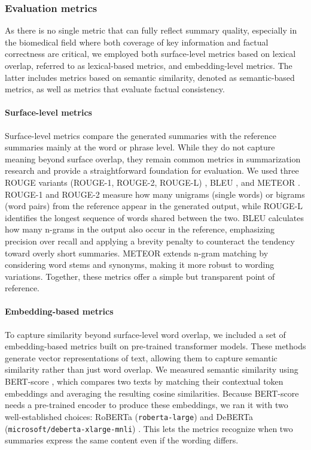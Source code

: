 \subsubsection{Evaluation metrics}

As there is no single metric that can fully reflect summary quality, especially in the biomedical field where both coverage of key information and factual correctness are critical, we employed both surface-level metrics based on lexical overlap, referred to as lexical-based metrics, and embedding-level metrics. The latter includes metrics based on semantic similarity, denoted as semantic-based metrics, as well as metrics that evaluate factual consistency.

\paragraph{Surface-level metrics}

Surface-level metrics compare the generated summaries with the reference summaries mainly at the word or phrase level. While they do not capture meaning beyond surface overlap, they remain common metrics in summarization research and provide a straightforward foundation for evaluation. We used three \ac{ROUGE} variants (ROUGE-1, ROUGE-2, ROUGE-L) \cite{lin-2004-rouge}, \ac{BLEU} \cite{papineni-etal-2002-bleu}, and \ac{METEOR} \cite{banerjee-lavie-2005-meteor}. ROUGE-1 and ROUGE-2 measure how many unigrams (single words) or bigrams (word pairs) from the reference appear in the generated output, while ROUGE-L identifies the longest sequence of words shared between the two. \ac{BLEU} calculates how many n-grams in the output also occur in the reference, emphasizing precision over recall and applying a brevity penalty to counteract the tendency toward overly short summaries. \ac{METEOR} extends n-gram matching by considering word stems and synonyms, making it more robust to wording variations. Together, these metrics offer a simple but transparent point of reference.

\paragraph{Embedding-based metrics}

To capture similarity beyond surface-level word overlap, we included a set of embedding-based metrics built on pre-trained transformer models. These methods generate vector representations of text, allowing them to capture semantic similarity rather than just word overlap. We measured semantic similarity using BERT-score \cite{zhang2020bertscoreevaluatingtextgeneration}, which compares two texts by matching their contextual token embeddings and averaging the resulting cosine similarities. Because BERT-score needs a pre-trained encoder to produce these embeddings, we ran it with two well-established choices: \ac{RoBERTa} (\texttt{roberta-large}) \cite{liu2019robertarobustlyoptimizedbert} and \ac{DeBERTa} (\texttt{microsoft/deberta-xlarge-mnli}) \cite{he2021debertadecodingenhancedbertdisentangled}. This lets the metrics recognize when two summaries express the same content even if the wording differs.

